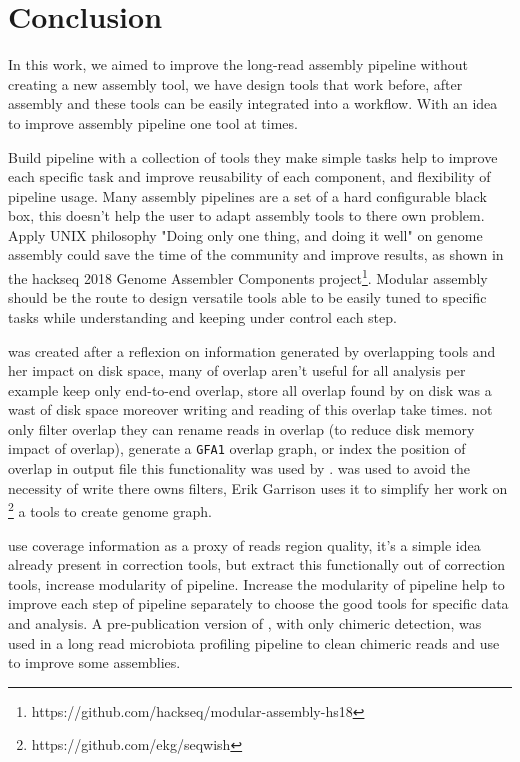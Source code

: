 \documentclass[main.tex]{subfiles}
\begin{document}
\chapter{Conclusion}

In this work, we aimed to improve the long-read assembly pipeline without creating a new assembly tool, we have design tools that work before, after assembly and these tools can be easily integrated into a workflow. With an idea to improve assembly pipeline one tool at times.

Build pipeline with a collection of tools they make simple tasks help to improve each specific task and improve reusability of each component, and flexibility of pipeline usage. Many assembly pipelines are a set of a hard configurable black box, this doesn't help the user to adapt assembly tools to there own problem. Apply UNIX philosophy "Doing only one thing, and doing it well" on genome assembly could save the time of the community and improve results, as shown in the hackseq 2018 Genome Assembler Components project\footnote{https://github.com/hackseq/modular-assembly-hs18}. Modular assembly should be the route to design versatile tools able to be easily tuned to specific tasks while understanding and keeping under control each step.

\fpa was created after a reflexion on information generated by overlapping tools and her impact on disk space, many of overlap aren't useful for all analysis per example \miniasm keep only end-to-end overlap, store all overlap found by \minimap on disk was a wast of disk space moreover writing and reading of this overlap take times. \fpa not only filter overlap they can rename reads in overlap (to reduce disk memory impact of overlap), generate a \texttt{GFA1} overlap graph, or index the position of overlap in output file this functionality was used by \consent \cite{CONSENT}. \fpa was used to avoid the necessity of write there owns filters, Erik Garrison uses it to simplify her work on \footnote{https://github.com/ekg/seqwish} a tools to create genome graph.

\yacrd use coverage information as a proxy of reads region quality, it's a simple idea already present in correction tools, but extract this functionally out of correction tools, increase modularity of pipeline. Increase the modularity of pipeline help to improve each step of pipeline separately to choose the good tools for specific data and analysis. A pre-publication version of \yacrd, with only chimeric detection, was used in a long read microbiota profiling pipeline to clean chimeric reads \cite{cite_yacrd} and use to improve some \flye assemblies. 
\end{document}
